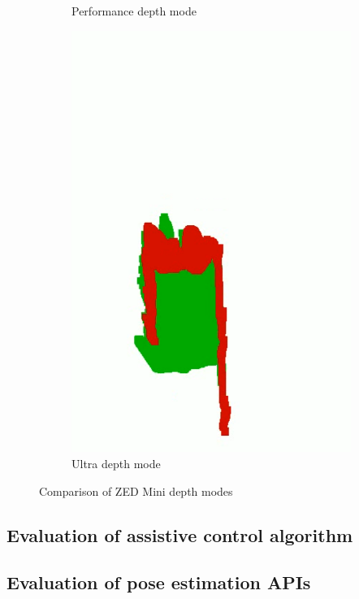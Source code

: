\begin{figure}[b]
\begin{subfigure}{.2\textwidth}
        \caption{Performance depth mode}
    \end{subfigure}
    \begin{subfigure}{.2\textwidth}
        \centering
        \includegraphics[width=\linewidth]{images/pcloud_indoor_ultra.PNG}
        \caption{Ultra depth mode}
    \end{subfigure}
    \caption{Comparison of ZED Mini depth modes}
    \label{fig:depth_mode_comparison}
\end{figure}

\subsection{Evaluation of assistive control algorithm}

\subsection{Evaluation of pose estimation APIs}
